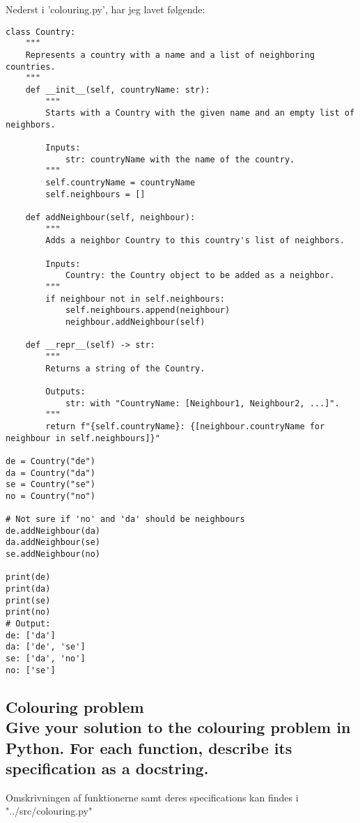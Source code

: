 \documentclass[a4paper,12pt]{article}
\begin{document}
Nederst i 'colouring.py', har jeg lavet følgende:

\begin{lstlisting}
class Country:
    """
    Represents a country with a name and a list of neighboring countries.
    """
    def __init__(self, countryName: str):
        """
        Starts with a Country with the given name and an empty list of neighbors.

        Inputs:
            str: countryName with the name of the country.
        """
        self.countryName = countryName
        self.neighbours = []
    
    def addNeighbour(self, neighbour):
        """
        Adds a neighbor Country to this country's list of neighbors.

        Inputs:
            Country: the Country object to be added as a neighbor.
        """
        if neighbour not in self.neighbours:
            self.neighbours.append(neighbour)
            neighbour.addNeighbour(self)
    
    def __repr__(self) -> str:
        """
        Returns a string of the Country.
        
        Outputs:
            str: with "CountryName: [Neighbour1, Neighbour2, ...]".
        """
        return f"{self.countryName}: {[neighbour.countryName for neighbour in self.neighbours]}"
    
de = Country("de")
da = Country("da")
se = Country("se")
no = Country("no")
    
# Not sure if 'no' and 'da' should be neighbours
de.addNeighbour(da)
da.addNeighbour(se)
se.addNeighbour(no)
    
print(de)
print(da)
print(se)
print(no)
# Output:
de: ['da']
da: ['de', 'se']
se: ['da', 'no']
no: ['se']
\end{lstlisting}


\subsection[Colouring problem]{Colouring problem\\
Give your solution to the colouring problem in Python. For each function, describe its specification as a docstring.}

Omskrivningen af funktionerne samt deres specifications kan findes i "../src/colouring.py"

\end{document}
